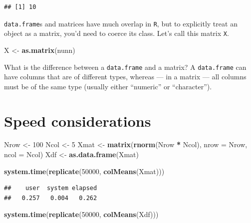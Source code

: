 \documentclass[]{book}
\newenvironment{Shaded}{\begin{snugshade}}{\end{snugshade}}
\newcommand{\DataTypeTok}[1]{\textcolor[rgb]{0.13,0.29,0.53}{#1}}
\newcommand{\DecValTok}[1]{\textcolor[rgb]{0.00,0.00,0.81}{#1}}
\newcommand{\KeywordTok}[1]{\textcolor[rgb]{0.13,0.29,0.53}{\textbf{#1}}}
\newcommand{\NormalTok}[1]{#1}
\newcommand{\OperatorTok}[1]{\textcolor[rgb]{0.81,0.36,0.00}{\textbf{#1}}}
\newcommand{\StringTok}[1]{\textcolor[rgb]{0.31,0.60,0.02}{#1}}
\theoremstyle{definition}
\theoremstyle{definition}
\theoremstyle{definition}
\theoremstyle{remark}
\begin{document}
\begin{verbatim}
## [1] 10
\end{verbatim}

\texttt{data.frame}s and matrices have much overlap in \texttt{R}, but to explicitly treat an object as a matrix, you'd need to coerce its class. Let's call this matrix \texttt{X}.

\begin{Shaded}
\begin{Highlighting}[]
\NormalTok{X <-}\StringTok{ }\KeywordTok{as.matrix}\NormalTok{(nunn)}
\end{Highlighting}
\end{Shaded}

What is the difference between a \texttt{data.frame} and a matrix? A \texttt{data.frame} can have columns that are of different types, whereas --- in a matrix --- all columns must be of the same type (usually either ``numeric'' or ``character'').

\hypertarget{speed-considerations}{%
\section{Speed considerations}\label{speed-considerations}}

\begin{Shaded}
\begin{Highlighting}[]
\NormalTok{Nrow <-}\StringTok{ }\DecValTok{100}
\NormalTok{Ncol <-}\StringTok{ }\DecValTok{5}
\NormalTok{Xmat <-}\StringTok{ }\KeywordTok{matrix}\NormalTok{(}\KeywordTok{rnorm}\NormalTok{(Nrow }\OperatorTok{*}\StringTok{ }\NormalTok{Ncol), }\DataTypeTok{nrow =}\NormalTok{ Nrow, }\DataTypeTok{ncol =}\NormalTok{ Ncol)}
\NormalTok{Xdf <-}\StringTok{ }\KeywordTok{as.data.frame}\NormalTok{(Xmat)}

\KeywordTok{system.time}\NormalTok{(}\KeywordTok{replicate}\NormalTok{(}\DecValTok{50000}\NormalTok{, }\KeywordTok{colMeans}\NormalTok{(Xmat)))}
\end{Highlighting}
\end{Shaded}

\begin{verbatim}
##    user  system elapsed 
##   0.257   0.004   0.262
\end{verbatim}

\begin{Shaded}
\begin{Highlighting}[]
\KeywordTok{system.time}\NormalTok{(}\KeywordTok{replicate}\NormalTok{(}\DecValTok{50000}\NormalTok{, }\KeywordTok{colMeans}\NormalTok{(Xdf)))}
\end{Highlighting}
\end{Shaded}
\end{document}
